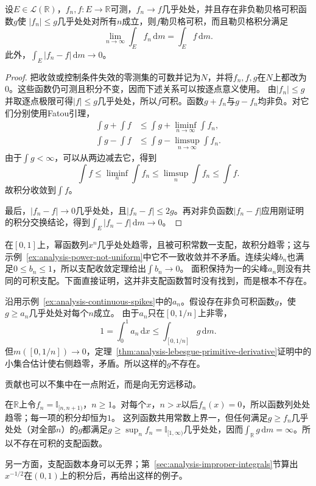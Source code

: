 \begin{theorem}[支配收敛定理]
\label{thm:analysis-dominated-convergence}
设$E\in\mathcal L(\mathbb R)$，$f_n,f:E\to\mathbb{R}$可测，$f_n\to f$几乎处处，并且存在非负勒贝格可积函数$g$使
$|f_n|\leq g$几乎处处对所有$n$成立，则$f$勒贝格可积，而且勒贝格积分满足
\[   \lim_{n\to\infty}\int_Ef_n\,\mathrm{d}m   =   \int_Ef\,\mathrm{d}m. \]
此外，$\int_E|f_n-f|\,\mathrm{d}m\to0$。
\end{theorem}
\begin{proof}
把收敛或控制条件失效的零测集的可数并记为$N$，并将$f_n,f,g$在$N$上都改为
$0$。这些函数仍可测且积分不变，因而下述关系可以按逐点意义使用。
由$|f_n|\leq g$并取逐点极限可得$|f|\leq g$几乎处处，所以$f$可积。函数$g+f_n$与$g-f_n$均非负。对它们分别使用Fatou引理，
\begin{align*}
  \int g+\int f
  &\leq
  \int g+\liminf_{n\to\infty}\int f_n,\\
  \int g-\int f
  &\leq
  \int g-\limsup_{n\to\infty}\int f_n.
\end{align*}
由于$\int g<\infty$，可以从两边减去它，得到
\[   \int f   \leq\liminf_n\int f_n   \leq\limsup_n\int f_n   \leq\int f. \]
故积分收敛到$\int f$。

最后，$|f_n-f|\to0$几乎处处，且$|f_n-f|\leq2g$。再对非负函数$|f_n-f|$应用刚证明的积分交换结论，得到$\int_E|f_n-f|\,\mathrm{d}m\to0$。
\end{proof}

在$[0,1]$上，幂函数列$x^n$几乎处处趋零，且被可积常数一支配，故积分趋零；这与示例~\ref{ex:analysis-power-not-uniform}中它不一致收敛并不矛盾。连续尖峰$b_n$也满足$0\leq b_n\leq1$，所以支配收敛定理给出$\int b_n\to0$。
面积保持为一的尖峰$a_n$则没有共同的可积支配。下面直接证明，这并非支配函数暂时没有找到，而是根本不存在。
\begin{example}[面积不变的尖峰没有可积支配函数]
\label{ex:analysis-spike-no-dominating}
沿用示例~\ref{ex:analysis-continuous-spikes}中的$a_n$。假设存在非负可积函数$g$，使$g\geq a_n$几乎处处对每个$n$成立。
由于$a_n$只在$[0,1/n]$上非零，
\[
 1=\int_0^1a_n\,\mathrm dx\leq\int_{[0,1/n]}g\,\mathrm dm.
\]
但$m([0,1/n])\to0$，定理~\ref{thm:analysis-lebesgue-primitive-derivative}证明中的小集合估计使右侧趋零，矛盾。所以这样的$g$不存在。
\end{example}

贡献也可以不集中在一点附近，而是向无穷远移动。
\begin{example}[向无穷远平移的矩形]
\label{ex:analysis-moving-indicator}
在$\mathbb R$上令$f_n=\mathbb I_{[n,n+1)}$，$n\geq1$。对每个$x$，$n>x$以后$f_n(x)=0$，所以函数列处处趋零；每一项的积分却恒为$1$。
这列函数共用常数上界一，但任何满足$g\geq f_n$几乎处处（对全部$n$）的$g$都满足$g\geq\sup_nf_n=\mathbb I_{[1,\infty)}$几乎处处，因而$\int_{\mathbb R}g\,\mathrm dm=\infty$。所以不存在可积的支配函数。
\end{example}
另一方面，支配函数本身可以无界；第~\ref{sec:analysis-improper-integrals}节算出$x^{-1/2}$在$(0,1)$上的积分后，再给出这样的例子。

